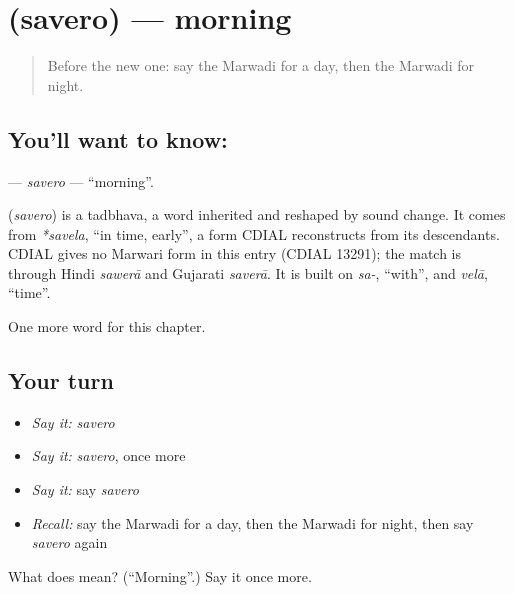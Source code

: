 \section[\texorpdfstring{\mw{सवेरो} (savero)}{सवेरो (savero)}]{ (savero) — morning}

\label{lesson:MW-C78-savero}



\begin{quote}
Before the new one: say the Marwadi for a day, then the Marwadi for night.
\end{quote}

\subsection*{You'll want to know: }
\textbf{} — \emph{savero} — \textquotedblleft{}morning\textquotedblright{}.

\begin{cousinweb}
\textbf{} (\emph{savero}) is a tadbhava, a word inherited and reshaped by sound change. It comes from \emph{*savela}, \textquotedblleft{}in time, early\textquotedblright{}, a form CDIAL reconstructs from its descendants. CDIAL gives no Marwari form in this entry (CDIAL 13291); the match is through Hindi \emph{sawerā} and Gujarati \emph{saverā}. It is built on \emph{sa-}, \textquotedblleft{}with\textquotedblright{}, and \emph{velā}, \textquotedblleft{}time\textquotedblright{}.
\end{cousinweb}

\begin{grammarlens}[title={What you've built}]
One more word for this chapter.
\end{grammarlens}

\subsection*{Your turn}
\begin{itemize}
\raggedright
  \item \emph{Say it:} \emph{savero}
  \item \emph{Say it:} \emph{savero}, once more
  \item \emph{Say it:} say \emph{savero}
  \item \emph{Recall:} say the Marwadi for a day, then the Marwadi for night, then say \emph{savero} again
\end{itemize}

\begin{tcolorbox}[breakable,colback=teal!4,colframe=teal!35!black,title={Before you move on}]
What does  mean? (\textquotedblleft{}Morning\textquotedblright{}.) Say it once more.
\end{tcolorbox}
